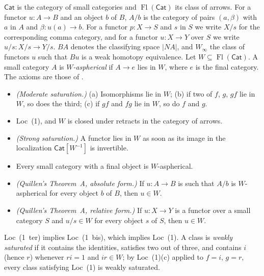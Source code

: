 \documentclass[11pt,a4paper]{article}
\theoremstyle{definition}
\newcommand{\Cat}{\mathsf{Cat}}
\newcommand{\Fl}{\operatorname{Fl}}
\newcommand{\Winf}{W_{\infty}}
\begin{document}
$\Cat$ is the category of small categories and $\Fl(\Cat)$ its class of arrows. For a
functor $u\colon A\to B$ and an object $b$ of $B$, $A/b$ is the category of pairs $(a,\beta)$
with $a$ in $A$ and $\beta\colon u(a)\to b$. For a functor $p\colon X\to S$ and $s$ in $S$
we write $X/s$ for the corresponding comma category, and for a functor $u\colon X\to Y$ over
$S$ we write $u/s\colon X/s\to Y/s$. $BA$ denotes the classifying space $|NA|$, and $\Winf$
the class of functors $u$ such that $Bu$ is a weak homotopy equivalence. Let
$W\subseteq\Fl(\Cat)$. A small category $A$ is \emph{$W$-aspherical} if $A\to e$ lies in
$W$, where $e$ is the final category. The axioms are those of \cite[XVI]{Der}.
\begin{itemize}[leftmargin=5.8em,labelwidth=5.3em,labelsep=0.5em,align=left]
\item[Loc (1)] \emph{(Moderate saturation.)} (a) Isomorphisms lie in $W$; (b) if two of
$f$, $g$, $gf$ lie in $W$, so does the third; (c) if $gf$ and $fg$ lie in $W$, so do $f$ and
$g$.
\item[Loc (1 bis)] Loc~(1), and $W$ is closed under retracts in the category of arrows.
\item[Loc (1 ter)] \emph{(Strong saturation.)} A functor lies in $W$ as soon as its image in
the localization $\Cat[W^{-1}]$ is invertible.
\item[Loc (2)] Every small category with a final object is $W$-aspherical.
\item[Loc (3)] \emph{(Quillen's Theorem~A, absolute form.)} If $u\colon A\to B$ is such that $A/b$ is
$W$-aspherical for every object $b$ of $B$, then $u\in W$.
\item[Loc (3 bis)] \emph{(Quillen's Theorem~A, relative form.)} If $u\colon X\to Y$ is a functor over a small
category $S$ and $u/s\in W$ for every object $s$ of $S$, then $u\in W$.
\end{itemize}
Loc~(1~ter) implies Loc~(1~bis), which implies Loc~(1). A class is \emph{weakly saturated}
\cite[1.4.12]{Cis06} if it contains the identities, satisfies two out of three, and contains
$i$ (hence $r$) whenever $ri=1$ and $ir\in W$; by Loc~(1)(c) applied to $f=i$, $g=r$, every
class satisfying Loc~(1) is weakly saturated.
\end{document}
